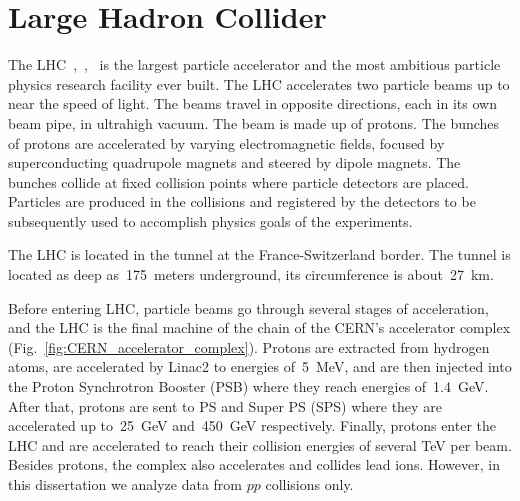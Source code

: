 \section{Large Hadron Collider}
\label{sec:Exp_LHC}

The LHC~\cite{ref_LHC_brochure},~\cite{ref_LHC_TDR},~\cite{ref_LHC_website} is the largest particle accelerator and the most ambitious particle physics research facility ever built. The LHC accelerates two particle beams up to near the speed of light. The beams travel in opposite directions, each in its own beam pipe, in ultrahigh vacuum. The beam is made up of protons. The bunches of protons are accelerated by varying electromagnetic fields, focused by superconducting quadrupole magnets and steered by dipole magnets. The bunches collide at fixed collision points where particle detectors are placed. Particles are produced in the collisions and registered by the detectors to be subsequently used to accomplish physics goals of the experiments.  


The LHC is located in the tunnel at the France-Switzerland border. The tunnel is located as deep as~175~meters underground, its circumference is about~27~km.

Before entering LHC, particle beams go through several stages of acceleration, and the LHC is the final machine of the chain of the CERN's accelerator complex (Fig.~\ref{fig:CERN_accelerator_complex}). Protons are extracted from hydrogen atoms, are accelerated by Linac2 to energies of~5~MeV, and are then injected into the Proton Synchrotron Booster (PSB) where they reach energies of~1.4~GeV. After that, protons are sent to PS and Super PS (SPS) where they are accelerated up to~25~GeV and~450~GeV respectively. Finally, protons enter the LHC and are accelerated to reach their collision energies of several TeV per beam. Besides protons, the complex also accelerates and collides lead ions. However, in this dissertation we analyze data from $pp$ collisions only.   


